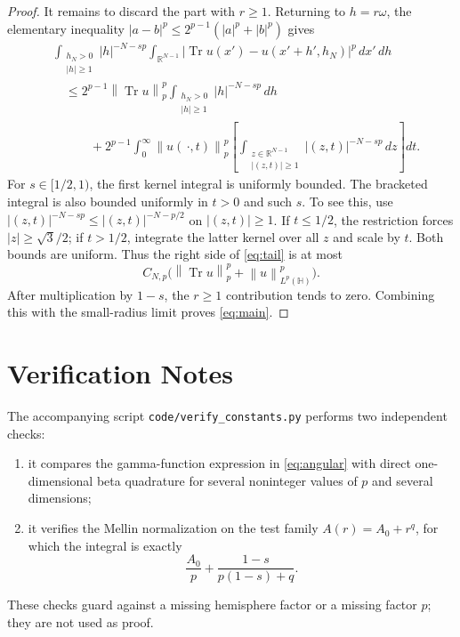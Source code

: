\documentclass[11pt]{article}
\newcommand{\R}{\mathbb R}
\newcommand{\Hh}{\mathbb H}
\newcommand{\Tr}{\operatorname{Tr}}
\newcommand{\norm}[1]{\left\lVert #1\right\rVert}
\begin{document}
\begin{proof}
It remains to discard the part with \(r\geq1\).  Returning to
\(h=r\omega\), the elementary inequality
\(|a-b|^p\leq2^{p-1}(|a|^p+|b|^p)\) gives
\begin{equation}\label{eq:tail}
\begin{split}
 &\int_{\substack{h_N>0\\|h|\geq1}}
 |h|^{-N-sp}
 \int_{\R^{N-1}}
 |\Tr u(x')-u(x'+h',h_N)|^p\,dx'\,dh
\\
 &\quad\leq 2^{p-1}\norm{\Tr u}_p^p
 \int_{\substack{h_N>0\\|h|\geq1}}|h|^{-N-sp}\,dh
\\
 &\qquad\quad+
 2^{p-1}
 \int_0^\infty \norm{u(\,\cdot,t)}_p^p
 \left[
 \int_{\substack{z\in\R^{N-1}\\|(z,t)|\geq1}}
 |(z,t)|^{-N-sp}\,dz
 \right]dt.
\end{split}
\end{equation}
For \(s\in[1/2,1)\), the first kernel integral is uniformly bounded.
The bracketed integral is also bounded uniformly in \(t>0\) and such
\(s\).  To see this, use
\(|(z,t)|^{-N-sp}\leq|(z,t)|^{-N-p/2}\) on \(|(z,t)|\geq1\).
If \(t\leq1/2\), the restriction forces
\(|z|\geq\sqrt3/2\); if \(t>1/2\), integrate the latter kernel over all
\(z\) and scale by \(t\).  Both bounds are uniform.
Thus the right side of \eqref{eq:tail} is at most
\[
                    C_{N,p}\bigl(
                    \norm{\Tr u}_p^p+\norm{u}_{L^p(\Hh)}^p\bigr).
\]
After multiplication by \(1-s\), the \(r\geq1\) contribution tends to
zero.  Combining this with the small-radius limit proves
\eqref{eq:main}.
\end{proof}

\section*{Verification Notes}

The accompanying script \texttt{code/verify\_constants.py} performs two
independent checks:
\begin{enumerate}
\item it compares the gamma-function expression in
\eqref{eq:angular} with direct one-dimensional beta quadrature for
several noninteger values of \(p\) and several dimensions;
\item it verifies the Mellin normalization on the test family
\(A(r)=A_0+r^q\), for which the integral is exactly
\[
 \frac{A_0}{p}+\frac{1-s}{p(1-s)+q}.
\]
\end{enumerate}
These checks guard against a missing hemisphere factor or a missing
factor \(p\); they are not used as proof.
\end{document}
